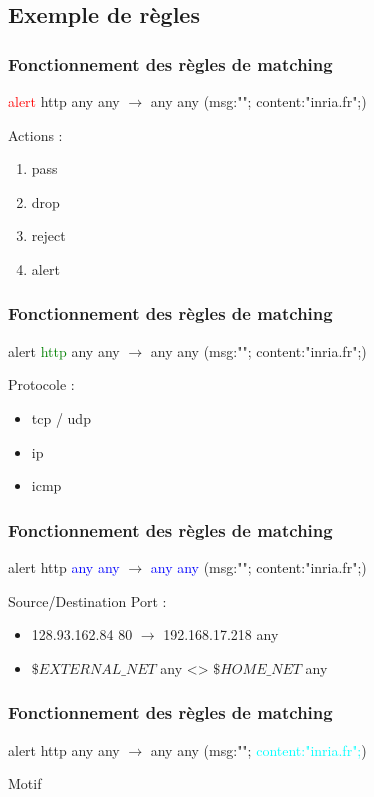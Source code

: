 \documentclass{beamer}
\begin{document}
\subsection{Exemple de règles}
\begin{frame}
\frametitle{Fonctionnement des règles de matching}
\begin{block}{}
\textcolor{red}{alert} http any any $\rightarrow$ any any (msg:""; content:"inria.fr";)
\end{block}
Actions :
\begin{enumerate}
\item pass
\item drop
\item reject
\item alert
\end{enumerate}
\end{frame}

\begin{frame}
\frametitle{Fonctionnement des règles de matching}
\begin{block}{}
alert \textcolor{green}{http} any any $\rightarrow$ any any (msg:""; content:"inria.fr";)
\end{block}
Protocole :
\begin{itemize}
[triangle]
\item tcp / udp
\item ip
\item icmp
\end{itemize}
\end{frame}

\begin{frame}
\frametitle{Fonctionnement des règles de matching}
\begin{block}{}
alert http \textcolor{blue}{any any}  $\rightarrow$ \textcolor{blue}{any any} (msg:""; content:"inria.fr";)
\end{block}
Source/Destination Port :
\begin{itemize}
[triangle]
\item 128.93.162.84 80 $\rightarrow$ 192.168.17.218 any
\item $\$EXTERNAL\_NET$ any <> $\$HOME\_NET$ any
\end{itemize}
\end{frame}

\begin{frame}
\frametitle{Fonctionnement des règles de matching}
\begin{block}{}
alert http any any $\rightarrow$ any any (msg:""; \textcolor{cyan}{content:"inria.fr";})
\end{block}
\begin{center}
Motif
\end{center}
\end{frame}
\end{document}

